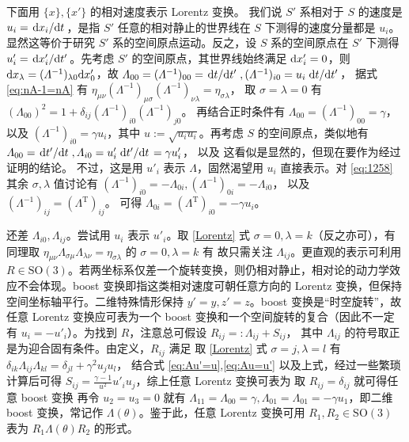 下面用 $\{x\},\{x'\}$ 的相对速度表示 Lorentz 变换。
我们说 $S'$ 系相对于 $S$ 的速度是 $u_i=\dv*{x_i}{t}$，是指 $S'$ 任意的相对静止的世界线在 $S$ 下测得的速度分量都是 $u_i$。显然这等价于研究 $S'$ 系的空间原点运动。反之，设 $S$ 系的空间原点在 $S'$ 下测得 $u'_i=\dv*{x'_i}{t'}$。先考虑 $S'$ 的空间原点，其世界线始终满足 $\dd x'_i=0$，则 $\dd x_\lambda=(\Lambda^{-1})_{\lambda 0}\dd x'_0$，故 $\Lambda_{00}=(\Lambda^{-1})_{00}=\dv*{t}{t'},(\Lambda^{-1})_{i0}=u_i\dv*{t}{t'}$，
    据式 \eqref{eq:nA-1=nA} 有 $\eta_{\mu\nu}(\Lambda^{-1})_{\mu\sigma}(\Lambda^{-1})_{\nu\lambda}={\eta}_{\sigma\lambda}$，    取 $\sigma=\lambda=0$ 有 $(\Lambda_{00})^2=1+\delta_{ij}(\Lambda^{-1})_{i0}(\Lambda^{-1})_{j0}$。
    再结合正时条件有 $\Lambda_{00}=(\Lambda^{-1})_{00}=\gamma$，以及 $(\Lambda^{-1})_{i0}=\gamma u_i$，其中 $u:=\sqrt{u_i u_i}$。再考虑 $S$ 的空间原点，类似地有 $\Lambda_{00}=\dv*{t'}{t},\Lambda_{i0}=u'_i \dv*{t'}{t}=\gamma u'_i$，
    以及
    这看似是显然的，但现在要作为经过证明的结论。
    不过，这是用 $u'_i$ 表示 $\Lambda$，固然渴望用 $u_i$ 直接表示。对 \eqref{eq:1258} 其余 $\sigma,\lambda$ 值讨论有 $(\Lambda^{-1})_{i0}=-\Lambda_{0i},(\Lambda^{-1})_{0i} =-\Lambda_{i0}$，
    以及 $(\Lambda^{-1})_{ij}=(\Lambda^\mathrm{T})_{ij}$。
    可得 $\Lambda_{0i}=(\Lambda^\mathrm{T})_{i0}=-\gamma u_i$。

    还差 $\Lambda_{i0},\Lambda_{ij}$。尝试用 $u_i$ 表示 $u'_i$。取 \eqref{Lorentz} 式 $\sigma=0,\lambda=k$（反之亦可），有
    同理取 $\eta_{\mu\nu}\Lambda_{\sigma\mu}\Lambda_{\lambda\nu}={\eta}_{\sigma\lambda}$ 的 $\sigma=0,\lambda=k$ 有
    故只需关注 $\Lambda_{ij}$。更直观的表示可利用 $R\in\mathrm{SO}(3)$。若两坐标系仅差一个旋转变换，则仍相对静止，相对论的动力学效应不会体现。boost 变换即指这类相对速度可朝任意方向的 Lorentz 变换，但保持空间坐标轴平行。二维特殊情形保持 $y'=y,z'=z$。boost 变换是“时空旋转”，故任意 Lorentz 变换应可表为一个 boost 变换和一个空间旋转的复合（因此不一定有 $u_i=-u'_i$）。为找到 $R$，注意总可假设
    $R_{ij}=:\Lambda_{ij}+S_{ij}$，
    其中 $\Lambda_{ij}$ 的符号取正是为迎合固有条件。由定义，$R_{ij}$ 满足
    取 \eqref{Lorentz} 式 $\sigma=j,\lambda=l$ 有 $\delta_{ik}\Lambda_{ij}\Lambda_{kl}=\delta_{jl}+ \gamma^2 u_j u_l$，
    结合式 \eqref{eq:Au'=u},\eqref{eq:Au=u'} 以及上式，经过一些繁琐计算后可得 $S_{ij}=\frac{\gamma-1}{u^2}u'_i u_j$，综上任意 Lorentz 变换可表为
    取 $R_{ij}=\delta_{ij}$ 就可得任意 boost 变换
再令 $u_2=u_3=0$ 就有 $\Lambda_{11}=\Lambda_{00}=\gamma, \Lambda_{01}=\Lambda_{01}=-\gamma u_1$，即二维 boost 变换，常记作 $\Lambda(\theta)$。鉴于此，任意 Lorentz 变换可用 $R_{1},R_{2}\in\mathrm{SO}(3)$ 表为 $R_{1} \Lambda(\theta) R_{2}$ 的形式。

